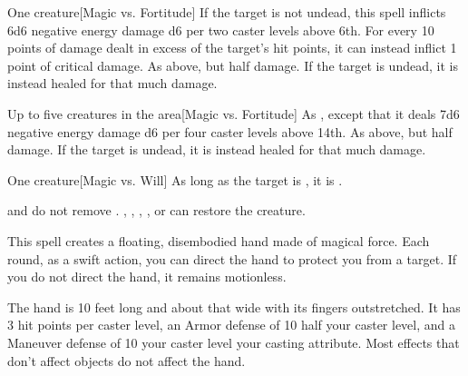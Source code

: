 \spellrng{\rngclose}
\begin{spelltarget}{One creature}[Magic vs. Fortitude]
    \spellsuccess If the target is not undead, this spell inflicts 6d6 negative energy damage \add d6 per two caster levels above 6th. For every 10 points of damage dealt in excess of the target's hit points, it can instead inflict 1 point of critical damage.
    \spellfailure As above, but half damage.
    \spelleffect If the target is undead, it is instead healed for that much damage.
\end{spelltarget}

\begin{spelltargets}{Up to five creatures in the area}[Magic vs. Fortitude]
    \spellsuccess As , except that it deals 7d6 negative energy damage \add d6 per four caster levels above 14th.
    \spellfailure As above, but half damage.
    \spelleffect If the target is undead, it is instead healed for that much damage.
\end{spelltargets}

\spellrng{\rngclose}
\begin{spelltarget}{One creature}[Magic vs. Will]
    \spellsuccess As long as the target is \bloodied, it is \confused.
\end{spelltarget}
\spellnotes {} and  do not remove . , , , , or  can restore the creature.

\spellrng{\rngmed}
\spelldur{\durshort \dismissable}
\spellline
\spelleffect This spell creates a floating, disembodied hand made of magical force. Each round, as a swift action, you can direct the hand to protect you from a target. If you do not direct the hand, it remains motionless.

The hand is 10 feet long and about that wide with its fingers outstretched. It has 3 hit points per caster level, an Armor defense of 10 \add half your caster level, and a Maneuver defense of 10 \add your caster level \add your casting attribute. Most effects that don't affect objects do not affect the hand.

